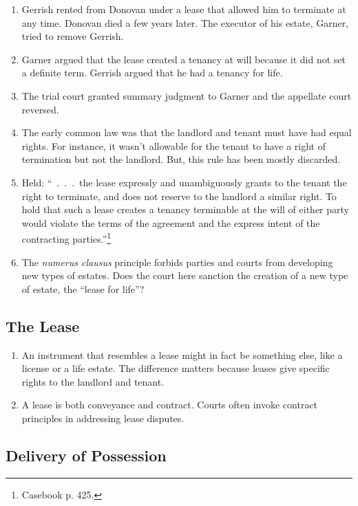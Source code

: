 \begin{enumerate}
    \item Gerrish rented from Donovan under a lease that allowed him to 
    terminate at any time. Donovan died a few years later. The executor of his 
    estate, Garner, tried to remove Gerrish.
    \item Garner argued that the lease created a tenancy at will because it 
    did not set a definite term. Gerrish argued that he had a tenancy for 
    life.
    \item The trial court granted summary judgment to Garner and the appellate 
    court reversed.
    \item The early common law was that the landlord and tenant must have had 
    equal rights. For instance, it wasn't allowable for the tenant to have a 
    right of termination but not the landlord. But, this rule has been mostly 
    discarded.
    \item Held: ``~.~.~.~the lease expressly and unambiguously grants to the 
    tenant the right to terminate, and does not reserve to the landlord a 
    similar right. To hold that such a lease creates a tenancy terminable at 
    the will of either party would violate the terms of the agreement and the 
    express intent of the contracting parties.''\footnote{Casebook p. 425.}
    \item The \emph{numerus clausus} principle forbids parties and courts from 
    developing new types of estates. Does the court here sanction the creation 
    of a new type of estate, the ``lease for life''?
\end{enumerate}

\subsection{The Lease}

\begin{enumerate}
    \item An instrument that resembles a lease might in fact be something 
    else, like a license or a life estate. The difference matters because 
    leases give specific rights to the landlord and tenant.
    \item A lease is both conveyance and contract. Courts often invoke 
    contract principles in addressing lease disputes.
\end{enumerate}

\subsection{Delivery of Possession}

